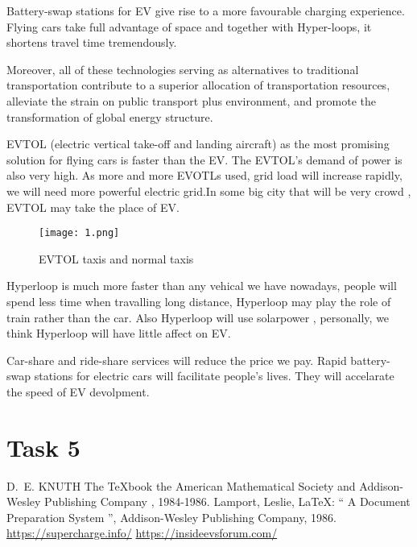 \documentclass{mcmthesis}
\begin{document}
Battery-swap stations for EV give rise to a more favourable charging experience. Flying cars take full advantage of space and together with Hyper-loops, it shortens travel time tremendously. 

Moreover, all of these technologies serving as alternatives to traditional transportation contribute to a superior allocation of transportation resources, alleviate the strain on public transport plus environment, and promote the transformation of global energy structure.

EVTOL (electric vertical take-off and landing aircraft) as the most promising solution for flying cars is faster than the EV. The EVTOL's demand of power is also very high. As more and more EVOTLs used, grid load will increase rapidly, we will need more powerful electric grid.In some big city that will be very crowd , EVTOL may take the place of EV.

\begin{figure}[htbp]
\small
\centering
\texttt{[image: 1.png]}
\caption{EVTOL taxis and normal taxis} 
\end{figure}

Hyperloop is much more faster than any vehical we have nowadays, people will spend less time when travalling long distance, Hyperloop may play the role of train rather than the car. Also Hyperloop will use solarpower , personally, we think Hyperloop will have little affect on EV.

Car-share and ride-share services will reduce the price we pay. Rapid battery-swap stations for electric cars will facilitate people's lives. They will accelarate the speed of EV devolpment.

\section{Task 5 } 


\begin{thebibliography}{99}
 D.~E. KNUTH   The \TeX{}book  the American
Mathematical Society and Addison-Wesley
Publishing Company , 1984-1986.
Lamport, Leslie,  \LaTeX{}: `` A Document Preparation System '',
Addison-Wesley Publishing Company, 1986.
\url{https://supercharge.info/}
\url{https://insideevsforum.com/}
\end{thebibliography}
\end{document}
